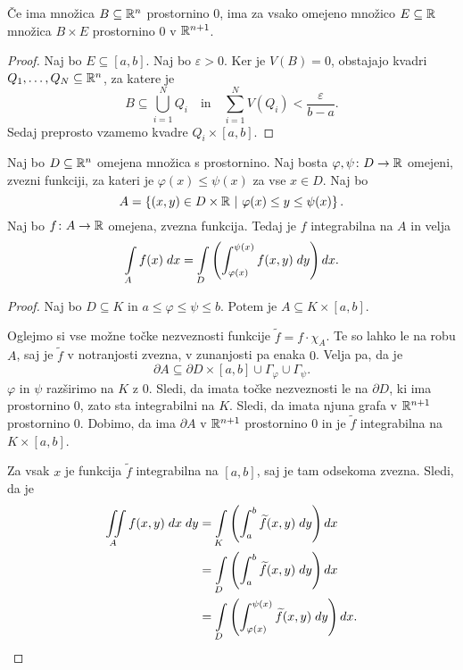 \begin{lema}
Če ima množica $B \subseteq \mathbb{R}^n$ prostornino $0$, ima za vsako
omejeno množico $E \subseteq \mathbb{R}$ množica $B \times E$ prostornino
$0$ v $\mathbb{R}^{n+1}$.
\end{lema}

\begin{proof}
Naj bo $E \subseteq [a,b]$. Naj bo $\varepsilon > 0$. Ker je
$V(B) = 0$, obstajajo kvadri $Q_1,\dots,Q_N \subseteq \mathbb{R}^n$, za
katere je
\[
B \subseteq \bigcup_{i=1}^N Q_i
\quad \text{in} \quad
\sum_{i=1}^N V(Q_i) < \frac{\varepsilon}{b-a}.
\]
Sedaj preprosto vzamemo kvadre $Q_i \times [a,b]$.
\end{proof}

\begin{trditev}
Naj bo $D \subseteq \mathbb{R}^n$ omejena množica s prostornino. Naj bosta
$\varphi,\psi \colon D \to \mathbb{R}$ omejeni, zvezni funkciji, za kateri
je $\varphi(x) \leq \psi(x)$ za vse $x \in D$. Naj bo
\[
A = \left\{(x,y) \in D \times \mathbb{R}~\middle\vert~\varphi(x) \leq y \leq \psi(x)\right\}.
\]
Naj bo $f \colon A \to \mathbb{R}$ omejena, zvezna funkcija. Tedaj je $f$
integrabilna na $A$ in velja
\[
\int\limits_A f(x)\;dx =
\int\limits_D \left( \int_{\varphi(x)}^{\psi(x)} f(x,y)\;dy\right)dx.
\]
\end{trditev}

\begin{proof}
Naj bo $D \subseteq K$ in $a \leq \varphi \leq \psi \leq b$. Potem
je $A \subseteq K \times [a,b]$.

Oglejmo si vse možne točke nezveznosti funkcije
$\widetilde{f} = f \cdot \chi_A$. Te so lahko le na robu $A$, saj
je $\widetilde{f}$ v notranjosti zvezna, v zunanjosti pa enaka $0$.
Velja pa, da je
\[
\partial A \subseteq
\partial D \times [a,b] \cup \Gamma_\varphi \cup \Gamma_\psi.
\]
$\varphi$ in $\psi$ razširimo na $K$ z $0$. Sledi, da imata točke
nezveznosti le na $\partial D$, ki ima prostornino $0$, zato sta
integrabilni na $K$. Sledi, da imata njuna grafa v $\mathbb{R}^{n+1}$
prostornino $0$. Dobimo, da ima $\partial A$ v $\mathbb{R}^{n+1}$
prostornino $0$ in je $\widetilde{f}$ integrabilna na
$K \times [a,b]$.

Za vsak $x$ je funkcija $\widetilde{f}$ integrabilna na $[a,b]$,
saj je tam odsekoma zvezna. Sledi, da je
\begin{align*}
\iint\limits_A f(x,y)\;dx\;dy &=
\int\limits_K \left(\int_a^b \widetilde{f}(x,y)\;dy\right)dx
\\
&=
\int\limits_D \left(\int_a^b \widetilde{f}(x,y)\;dy\right)dx
\\
&=
\int\limits_D \left(
\int_{\varphi(x)}^{\psi(x)} \widetilde{f}(x,y)\;dy\right)dx.
\qedhere
\end{align*}
\end{proof}


